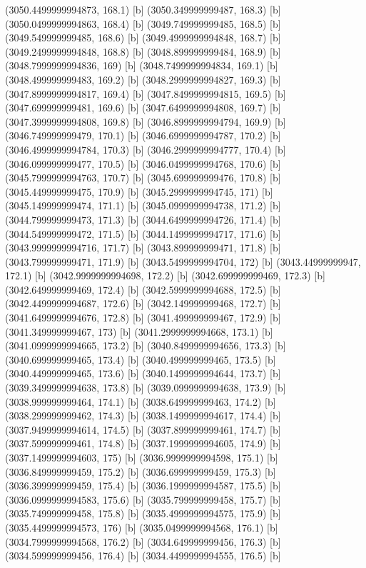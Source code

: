 {{{(3050.4499999994873, 168.1) [b] 
(3050.349999999487, 168.3) [b] 
(3050.0499999994863, 168.4) [b] 
(3049.749999999485, 168.5) [b] 
(3049.549999999485, 168.6) [b] 
(3049.4999999994848, 168.7) [b] 
(3049.2499999994848, 168.8) [b] 
(3048.899999999484, 168.9) [b] 
(3048.7999999994836, 169) [b] 
(3048.7499999994834, 169.1) [b] 
(3048.499999999483, 169.2) [b] 
(3048.2999999994827, 169.3) [b] 
(3047.8999999994817, 169.4) [b] 
(3047.8499999994815, 169.5) [b] 
(3047.699999999481, 169.6) [b] 
(3047.6499999994808, 169.7) [b] 
(3047.3999999994808, 169.8) [b] 
(3046.8999999994794, 169.9) [b] 
(3046.749999999479, 170.1) [b] 
(3046.6999999994787, 170.2) [b] 
(3046.4999999994784, 170.3) [b] 
(3046.2999999994777, 170.4) [b] 
(3046.099999999477, 170.5) [b] 
(3046.0499999994768, 170.6) [b] 
(3045.7999999994763, 170.7) [b] 
(3045.699999999476, 170.8) [b] 
(3045.449999999475, 170.9) [b] 
(3045.2999999994745, 171) [b] 
(3045.149999999474, 171.1) [b] 
(3045.0999999994738, 171.2) [b] 
(3044.799999999473, 171.3) [b] 
(3044.6499999994726, 171.4) [b] 
(3044.549999999472, 171.5) [b] 
(3044.1499999994717, 171.6) [b] 
(3043.9999999994716, 171.7) [b] 
(3043.899999999471, 171.8) [b] 
(3043.799999999471, 171.9) [b] 
(3043.5499999994704, 172) [b] 
(3043.44999999947, 172.1) [b] 
(3042.9999999994698, 172.2) [b] 
(3042.699999999469, 172.3) [b] 
(3042.649999999469, 172.4) [b] 
(3042.5999999994688, 172.5) [b] 
(3042.4499999994687, 172.6) [b] 
(3042.149999999468, 172.7) [b] 
(3041.6499999994676, 172.8) [b] 
(3041.499999999467, 172.9) [b] 
(3041.349999999467, 173) [b] 
(3041.2999999994668, 173.1) [b] 
(3041.0999999994665, 173.2) [b] 
(3040.8499999994656, 173.3) [b] 
(3040.699999999465, 173.4) [b] 
(3040.499999999465, 173.5) [b] 
(3040.449999999465, 173.6) [b] 
(3040.1499999994644, 173.7) [b] 
(3039.3499999994638, 173.8) [b] 
(3039.0999999994638, 173.9) [b] 
(3038.999999999464, 174.1) [b] 
(3038.649999999463, 174.2) [b] 
(3038.299999999462, 174.3) [b] 
(3038.1499999994617, 174.4) [b] 
(3037.9499999994614, 174.5) [b] 
(3037.899999999461, 174.7) [b] 
(3037.599999999461, 174.8) [b] 
(3037.1999999994605, 174.9) [b] 
(3037.1499999994603, 175) [b] 
(3036.9999999994598, 175.1) [b] 
(3036.849999999459, 175.2) [b] 
(3036.699999999459, 175.3) [b] 
(3036.399999999459, 175.4) [b] 
(3036.1999999994587, 175.5) [b] 
(3036.0999999994583, 175.6) [b] 
(3035.799999999458, 175.7) [b] 
(3035.749999999458, 175.8) [b] 
(3035.4999999994575, 175.9) [b] 
(3035.4499999994573, 176) [b] 
(3035.0499999994568, 176.1) [b] 
(3034.7999999994568, 176.2) [b] 
(3034.649999999456, 176.3) [b] 
(3034.599999999456, 176.4) [b] 
(3034.4499999994555, 176.5) [b] 
}}}
